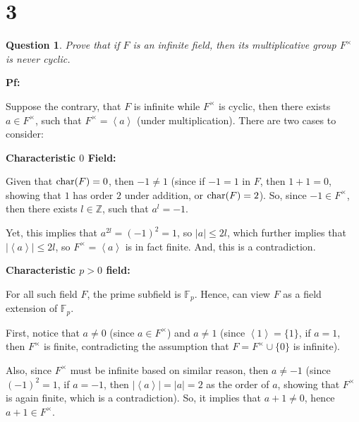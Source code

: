 \documentclass{article}
\newtheorem{question}{Question}
\begin{document}
\break

\section*{3}
\begin{myBox}[]{}
    \begin{question}
        Prove that if $F$ is an infinite field, then its multiplicative group $F^\times$ is never cyclic.
    \end{question}
\end{myBox}

\textbf{Pf:}

Suppose the contrary, that $F$ is infinite while $F^\times$ is cyclic, then there exists $a\in F^\times$, such that $F^\times = \left<a\right>$ (under multiplication). There are two cases to consider:

\hfil

\textbf{Characteristic $0$ Field:}

Given that $\textmd{char}(F)=0$, then $-1 \neq 1$ (since if $-1=1$ in $F$, then $1+1=0$, showing that $1$ has order $2$ under addition, or $\textmd{char}(F)=2$). So, since $-1\in F^\times$, then there exists $l\in\mathbb{Z}$, such that $a^l = -1$.

Yet, this implies that $a^{2l} = (-1)^2 = 1$, so $|a|\leq 2l$, which further implies that $|\left<a\right>| \leq 2l$, so $F^\times=\left<a\right>$ is in fact finite. And, this is a contradiction.

\hfil

\textbf{Characteristic $p>0$ field:}

For all such field $F$, the prime subfield is $\mathbb{F}_p$. Hence, can view $F$ as a field extension of $\mathbb{F}_p$.

First, notice that $a\neq 0$ (since $a\in F^\times$) and $a\neq 1$ (since $\left<1\right> = \{1\}$, if $a=1$, then $F^\times$ is finite, contradicting the assumption that $F=F^\times\cup \{0\}$ is infinite). 

Also, since $F^\times$ must be infinite based on similar reason, then $a\neq -1$ (since $(-1)^2=1$, if $a=-1$, then $|\left<a\right>| = |a|=2$ as the order of $a$, showing that $F^\times$ is again finite, which is a contradiction). So, it implies that $a+1\neq 0$, hence $a+1\in F^\times$.
\end{document}
